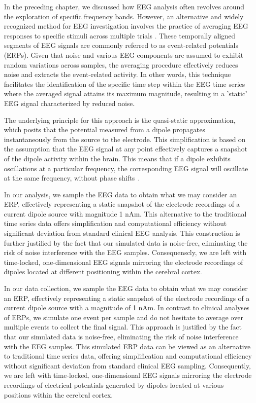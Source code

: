 \documentclass[a4paper, UKenglish, 11pt]{uiomaster}
\begin{document}
In the preceding chapter, we discussed how EEG analysis often revolves around the exploration of specific frequency bands. However, an alternative and widely recognized method for EEG investigation involves the practice of averaging EEG responses to specific stimuli across multiple trials \cite{kropotov2016functional}. These temporally aligned segments of EEG signals are commonly referred to as event-related potentials (ERPs). Given that noise and various EEG components are assumed to exhibit random variations across samples, the averaging procedure effectively reduces noise and extracts the event-related activity. In other words, this technique facilitates the identification of the specific time step within the EEG time series where the averaged signal attains its maximum magnitude, resulting in a 'static' EEG signal characterized by reduced noise.

The underlying principle for this approach is the quasi-static approximation, which posits that the potential measured from a dipole propagates instantaneously from the source to the electrode. This simplification is based on the assumption that the EEG signal at any point effectively captures a snapshot of the dipole activity within the brain. This means that if a dipole exhibits oscillations at a particular frequency, the corresponding EEG signal will oscillate at the same frequency, without phase shifts \cite{plonsey1967considerations}.

In our analysis, we sample the EEG data to obtain what we may consider an ERP, effectively representing a static snapshot of the electrode recordings of a current dipole source with magnitude 1 nAm. This alternative to the traditional time series data offers simplification and computational efficiency without significant deviation from standard clinical EEG analysis. This construction is further justified by the fact that our simulated data is noise-free, eliminating the risk of noise interference with the EEG samples. Consequenscly, we are left with time-locked, one-dimensional EEG signals mirroring the electrode recordings of dipoles located at different positioning within the cerebral cortex.

In our data collection, we sample the EEG data to obtain what we may consider an ERP, effectively representing a static snapshot of the electrode recordings of a current dipole source with a magnitude of 1 nAm. In contrast to clinical analyses of ERPs, we simulate one event per sample and do not hesitate to average over multiple events to collect the final signal. This approach is justified by the fact that our simulated data is noise-free, eliminating the risk of noise interference with the EEG samples. This simulated ERP data can be viewed as an alternative to traditional time series data, offering simplification and computational efficiency without significant deviation from standard clinical EEG sampling. Consequently, we are left with time-locked, one-dimensional EEG signals mirroring the electrode recordings of electrical potentials generated by dipoles located at various positions within the cerebral cortex.
\end{document}
